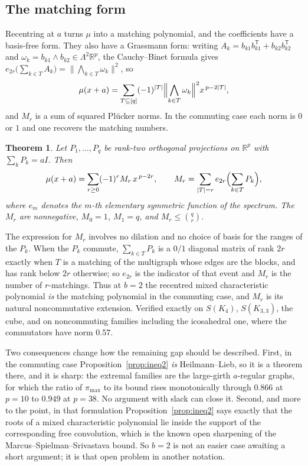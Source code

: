 \documentclass[11pt]{article}
\newtheorem{theorem}{Theorem}
\theoremstyle{remark}
\begin{document}
\subsection{The matching form}

Recentring at $a$ turns $\mu$ into a matching polynomial, and the coefficients have
a basis-free form. They also have a Grassmann form: writing
$A_k=b_{k1}b_{k1}^{\mathsf T}+b_{k2}b_{k2}^{\mathsf T}$ and
$\omega_k=b_{k1}\wedge b_{k2}\in\Lambda^2\mathbb R^p$, the Cauchy--Binet formula
gives $e_{2r}\bigl(\sum_{k\in T}A_k\bigr)=\bigl\|\bigwedge_{k\in T}\omega_k\bigr\|^2$,
so
\[
\mu(x+a)=\sum_{T\subseteq[q]}(-1)^{|T|}\Bigl\|\bigwedge_{k\in T}\omega_k\Bigr\|^2x^{\,p-2|T|},
\]
and $M_r$ is a sum of squared Pl\"ucker norms. In the commuting case each norm is
$0$ or $1$ and one recovers the matching numbers.

\begin{theorem}\label{thm:matchingform}
Let $P_1,\dots,P_q$ be rank-two orthogonal projections on $\mathbb R^p$ with
$\sum_kP_k=aI$. Then
\[
\mu(x+a)=\sum_{r\ge0}(-1)^rM_r\,x^{\,p-2r},\qquad
M_r=\sum_{|T|=r}e_{2r}\Bigl(\sum_{k\in T}P_k\Bigr),
\]
where $e_m$ denotes the $m$-th elementary symmetric function of the spectrum. The
$M_r$ are nonnegative, $M_0=1$, $M_1=q$, and $M_r\le\binom qr$.
\end{theorem}

The expression for $M_r$ involves no dilation and no choice of basis for the ranges
of the $P_k$. When the $P_k$ commute, $\sum_{k\in T}P_k$ is a $0/1$ diagonal matrix
of rank $2r$ exactly when $T$ is a matching of the multigraph whose edges are the
blocks, and has rank below $2r$ otherwise; so $e_{2r}$ is the indicator of that
event and $M_r$ is the number of $r$-matchings. Thus at $b=2$ the recentred mixed
characteristic polynomial \emph{is} the matching polynomial in the commuting case,
and $M_r$ is its natural noncommutative extension. Verified exactly on
$S(K_4)$, $S(K_{3,3})$, the cube, and on noncommuting families including the
icosahedral one, where the commutators have norm $0.57$.

Two consequences change how the remaining gap should be described. First, in the
commuting case Proposition~\ref{prop:ineq2} \emph{is} Heilmann--Lieb, so it is a
theorem there, and it is sharp: the extremal families are the large-girth
$a$-regular graphs, for which the ratio of $\pi_{\max}$ to its bound rises
monotonically through $0.866$ at $p=10$ to $0.949$ at $p=38$. No argument with
slack can close it. Second, and more to the point, in that formulation
Proposition~\ref{prop:ineq2} says exactly that the roots of a mixed characteristic
polynomial lie inside the support of the corresponding free convolution, which is
the known open sharpening of the Marcus--Spielman--Srivastava bound. So $b=2$ is
not an easier case awaiting a short argument; it is that open problem in another
notation.
\end{document}
